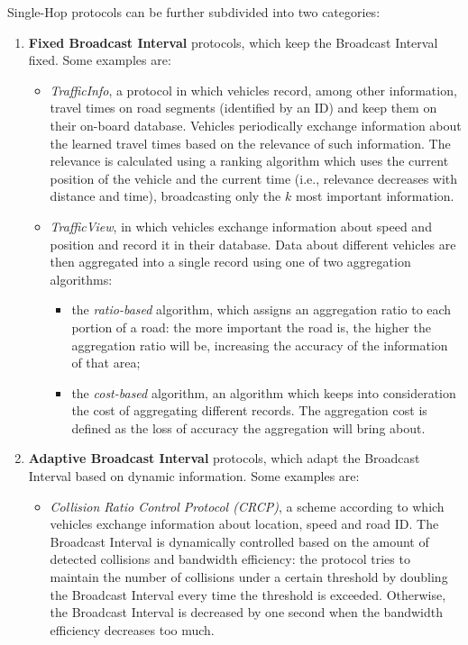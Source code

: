 		Single-Hop protocols can be further subdivided into two categories:
		\begin{enumerate}
			\item \textbf{Fixed Broadcast Interval} protocols, which keep the Broadcast Interval fixed. Some examples are:
			\begin{itemize}
				\renewcommand\labelitemi{--}
				\item \textit{TrafficInfo}\cite{4621303}, a protocol in which vehicles record, among other information, travel times on road segments (identified by an ID) and keep them on their on-board database. Vehicles periodically exchange information about the learned travel times based on the relevance of such information. The relevance is calculated using a ranking algorithm which uses the current position of the vehicle and the current time (i.e., relevance decreases with distance and time), broadcasting only the $k$  most important information. 
				\item \textit{TrafficView}\cite{1263039}, in which vehicles exchange information about speed and position and record it in their database. Data about different vehicles are then aggregated into a single record using one of two aggregation algorithms:
				\begin{itemize}
					\item the \textit{ratio-based} algorithm, which assigns an aggregation ratio to each portion of a road: the more important the road is, the higher the aggregation ratio will be, increasing the accuracy of the information of that area;
					\item the \textit{cost-based} algorithm, an algorithm which keeps into consideration the cost of aggregating different records. The aggregation cost is defined as the loss of accuracy the aggregation will bring about.
				\end{itemize} 
			\end{itemize}
			\item \textbf{Adaptive Broadcast Interval} protocols, which adapt the Broadcast Interval based on dynamic information. Some examples are:
			\begin{itemize}
				\renewcommand\labelitemi{--}
				
				\item \textit{Collision Ratio Control Protocol (CRCP)}\cite{4357748}, a scheme according to which vehicles exchange information about location, speed and road ID. The Broadcast Interval is dynamically controlled based on the amount of detected collisions and bandwidth efficiency: the protocol tries to maintain the number of collisions under a certain threshold by doubling the Broadcast Interval every time the threshold is exceeded. Otherwise, the Broadcast Interval is decreased by one second when the bandwidth efficiency decreases too much.
				

\end{itemize}
\end{enumerate}
